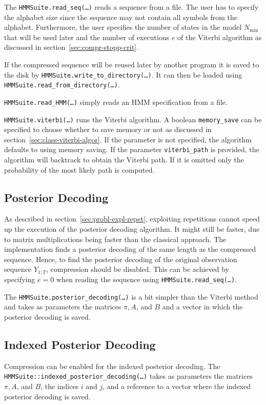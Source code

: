 The \texttt{HMMSuite.read\_seq(\dots)} reads a sequence from a file. The user
has to specify the alphabet size since the sequence may not contain all
symbols from the alphabet. Furthermore, the user specifies the number of states
in the model $N_{\min}$ that will be used later and the number of executions
$e$ of the Viterbi algorithm as discussed in
section~\ref{sec:compr-stopp-crit}.

If the compressed sequence will be reused later by another program it is saved
to the disk by \texttt{HMMSuite.write\_to\_directory(\dots)}. It can then be
loaded using \texttt{HMMSuite.read\_from\_directory(\dots)}.

\texttt{HMMSuite.read\_HMM(\dots)} simply reads an HMM specification from a
file.

\texttt{HMMSuite.viterbi(\dots)} runs the Viterbi algorithm. A boolean
\texttt{memory\_save} can be specified to choose whether to save memory or not
as discussed in section~\ref{sec:class-viterbi-algor}. If the parameter is not
specified, the algorithm defaults to using memory saving. If the parameter
\texttt{viterbi\_path} is provided, the algorithm will backtrack to obtain the
Viterbi path. If it is omitted only the probability of the most likely path is
computed.

\subsection{Posterior Decoding}

As described in section~\ref{sec:probl-expl-repet}, exploiting repetitions
cannot speed up the execution of the posterior decoding algorithm. It might still
be faster, due to matrix multiplications being faster than the classical
approach. The implementation finds a posterior decoding of the same length as
the compressed sequence. Hence, to find the posterior decoding of the original
observation sequence $Y_{1:T}$, compression should be disabled. This can be achieved by
specifying $e = 0$ when reading the sequence using
\texttt{HMMSuite.read\_seq(\dots)}.

The \texttt{HMMSuite.posterior\_decoding(\dots)} is a bit simpler than the
Viterbi method and takes as parameters the matrices $\pi, A$, and $B$ and a
vector in which the posterior decoding is saved.

\subsection{Indexed Posterior Decoding}

Compression can be enabled for the indexed posterior decoding. The
\texttt{HMMSuite::indexed\_posterior\_decoding(\dots)} takes as parameters the
matrices $\pi, A$, and $B$, the indices $i$ and $j$, and a reference to a vector
where the indexed posterior decoding is saved.

